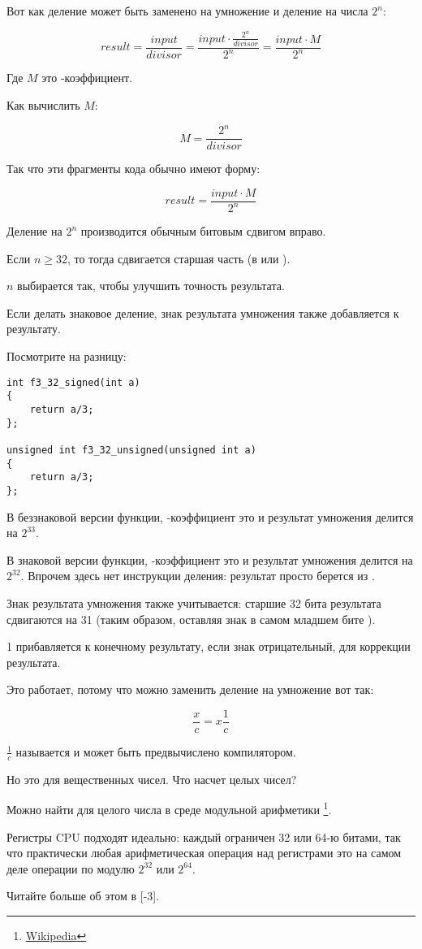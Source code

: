 ﻿

Вот как деление может быть заменено на умножение и деление на числа $2^{n}$:

\[
	result = 
	\frac{input}{divisor} = 
	\frac{input \cdot \frac{2^{n}}{divisor}}{2^{n}} = 
	\frac{input \cdot M}{2^{n}}
\]

Где $M$ это -коэффициент.

Как вычислить $M$:

\[
	M = \frac{2^{n}}{divisor}
\]

Так что эти фрагменты кода обычно имеют форму:

\[
	result = \frac{input \cdot M}{2^{n}}
\]

Деление на $2^{n}$ производится обычным битовым сдвигом вправо.

Если $n\geq32$, то тогда сдвигается старшая часть  (в \EDX или \RDX).

$n$ выбирается так, чтобы улучшить точность результата.

Если делать знаковое деление, знак результата умножения также добавляется к результату.

Посмотрите на разницу:

\begin{lstlisting}
int f3_32_signed(int a)
{
	return a/3;
};

unsigned int f3_32_unsigned(unsigned int a)
{
	return a/3;
};
\end{lstlisting}

В беззнаковой версии функции, -коэффициент это  и результат умножения делится на $2^{33}$.

В знаковой версии функции, -коэффициент это
  и результат умножения делится на $2^{32}$.
Впрочем здесь нет инструкции деления: результат просто берется из \EDX. 

Знак результата умножения также учитывается: старшие 32 бита результата сдвигаются на 31
(таким образом, оставляя знак в самом младшем бите \EAX).

1 прибавляется к конечному результату, если знак отрицательный, для коррекции результата.




Это работает, потому что можно заменить деление на умножение вот так:

\[
	\frac{x}{c} = x\frac{1}{c}
\]


$\frac{1}{c}$ называется  и может быть предвычислено компилятором.

Но это для вещественных чисел.
Что насчет целых чисел?

Можно найти  для целого числа в среде модульной арифметики
\footnote{\href{http://go.yurichev.com/17359}{Wikipedia}}.

Регистры \ac{CPU} подходят идеально: каждый ограничен 32 или 64-ю битами, так что практически любая арифметическая операция над регистрами это на самом деле операции по модулю $2^{32}$ или $2^{64}$.

Читайте больше об этом в [-3].
